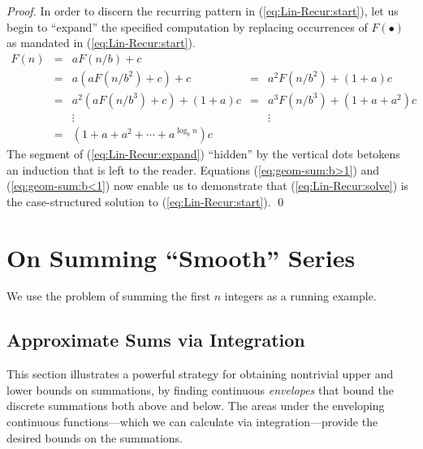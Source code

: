 \documentclass{article}
\begin{document}
\begin{proof}
In order to discern the recurring pattern in
(\ref{eq:Lin-Recur:start}), let us begin to ``expand'' the specified
computation by replacing occurrences of $F(\bullet)$ as mandated in
(\ref{eq:Lin-Recur:start}).
\begin{equation}
\label{eq:Lin-Recur:expand}
\begin{array}{lcccc}
F(n) & = & a F(n/b) + c & & \\
     & = & a \left( a F(n/b^2) + c \right) + c
             & = & a^2 F(n/b^2) + (1 + a)c \\
     & = & a^2 \left( a F(n/b^3) + c \right) + (1+a)c
             & = & a^3 F(n/b^3) + (1 + a + a^2)c \\
     &   & \vdots & & \vdots \\
     & = & 
{\displaystyle
\left( 1 + a + a^2 + \cdots + a^{\log_b n} \right) c
} & &
\end{array}
\end{equation}
The segment of (\ref{eq:Lin-Recur:expand}) ``hidden'' by the vertical
dots betokens an induction that is left to the reader.  Equations
(\ref{eq:geom-sum:b>1}) and (\ref{eq:geom-sum:b<1}) now enable us to
demonstrate that (\ref{eq:Lin-Recur:solve}) is the case-structured
solution to (\ref{eq:Lin-Recur:start}).  \qed
\end{proof}


\section{On Summing ``Smooth'' Series}
\label{sec:smooth-series}

We use the problem of summing the first $n$ integers as a running
example.

\subsection{Approximate Sums via Integration}
\label{sec:riemann-bounds}

This section illustrates a powerful strategy for obtaining nontrivial
upper and lower bounds on summations, by finding continuous {\em
  envelopes} that bound the discrete summations both above and below.
The areas under the enveloping continuous functions---which we can
calculate via integration---provide the desired bounds on the
summations.
\end{document}
